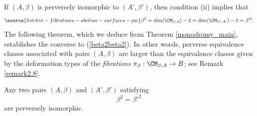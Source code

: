 If $(A, \beta)$ is perversely isomorphic to $(A', \beta')$, then condition (ii) implies that
\begin{equation}\label{beta2beta2}
\source{hitchin-fibrations-abelian-surfaces-pw}
\beta^2 = \mathrm{dim}(\CM_{\beta,A}) -2 = \mathrm{dim}(\CM_{\beta',A'}) -2 = \beta'^2.
\end{equation}
The following theorem, which we  deduce from Theorem \ref{monodromy_main}, establishes the  converse
to (\ref{beta2beta2}). In other words, perverse equivalence classes associated with pairs $(A, \beta)$ are larger than the equivalence classes
given  by the deformation types of the \emph{fibrations} $\pi_\beta: \CM_{\beta,A} \to B$; see Remark \ref{remark2.8}.


\begin{thm}
\notready\label{thm2.6}
Any two pairs $(A, \beta)$ and $(A', \beta')$ satisfying
\[
\beta^2 = \beta'^2
\]
are perversely isomorphic.
\end{thm}

